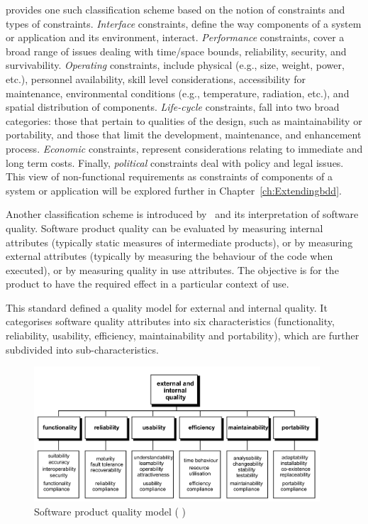 \documentclass[dissertation,final]{softeng}
\begin{document}
\citet{Roman:1985} provides one such classification scheme based on the notion of constraints and types of constraints. \emph{Interface} constraints, define the way components of a system or application and its environment, interact. \emph{Performance} constraints, cover a broad range of issues dealing with time/space bounds, reliability, security, and survivability. \emph{Operating} constraints, include physical (e.g., size, weight, power, etc.), personnel availability, skill level considerations, accessibility for maintenance, environmental conditions (e.g., temperature, radiation, etc.), and spatial distribution of components. \emph{Life-cycle} constraints, fall into two broad categories: those that pertain to qualities of the design, such as maintainability or portability, and those that limit the development, maintenance, and enhancement process. \emph{Economic} constraints, represent considerations relating to immediate and long term costs. Finally, \emph{political} constraints deal with policy and legal issues. This view of non-functional requirements as constraints of components of a system or application will be explored further in Chapter~\ref{ch:Extendingbdd}.

Another classification scheme is introduced by~ and its interpretation of software quality. Software product quality can be evaluated by measuring internal attributes (typically static measures of intermediate products), or by measuring external attributes (typically by measuring the behaviour of the code when executed), or by measuring quality in use attributes. The objective is for the product to have the required effect in a particular context of use.

This standard defined a quality model for external and internal quality. It categorises software quality attributes into six characteristics (functionality, reliability, usability, efficiency, maintainability and portability), which are further subdivided into sub-characteristics.

\begin{figure}[h]
\includegraphics[width=0.95\textwidth]{QualityInLifecycle}
\centering
\caption[Software product quality model]{Software product quality model ( )}
\label{fig:QualityInLifecycle}
\end{figure}
\end{document}
